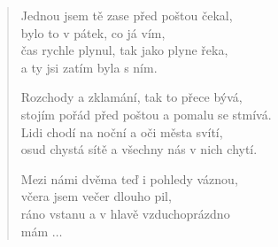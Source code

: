 \begin{multicols}{2}
\begin{verse}
Jednou jsem tě zase před poštou čekal,\\
bylo to v pátek, co já vím,\\
čas rychle plynul, tak jako plyne řeka,\\
a ty jsi zatím byla s ním.

Rozchody a zklamání, tak to přece bývá,\\
stojím pořád před poštou a pomalu se stmívá.\\
Lidi chodí na noční a oči města svítí,\\
osud chystá sítě a všechny nás v nich chytí.

Mezi námi dvěma teď i pohledy váznou,\\
včera jsem večer dlouho pil,\\
ráno vstanu a v hlavě vzduchoprázdno\\
mám $\ldots{}$ 
\end{verse}

\end{multicols}
